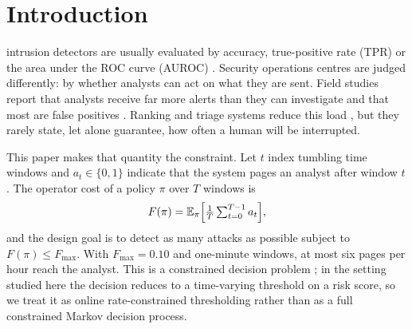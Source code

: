 \documentclass[journal,10pt,twocolumn]{IEEEtran}
\newcommand{\Fmax}{F_{\max}}
\newcommand{\EE}{\mathbb{E}}
\begin{document}
\section{Introduction}
 intrusion detectors are usually evaluated by accuracy, true-positive rate (TPR) or the area under the ROC curve (AUROC) \cite{chandola2009anomaly,buczak2016survey,sharafaldin2018cicids}. Security operations centres are judged differently: by whether analysts can act on what they are sent. Field studies report that analysts receive far more alerts than they can investigate and that most are false positives \cite{alahmadi2022falsepos,kokulu2019soc}. Ranking and triage systems reduce this load \cite{hassan2019nodoze}, but they rarely state, let alone guarantee, how often a human will be interrupted.

This paper makes that quantity the constraint. Let $t$ index tumbling time windows and $a_t\in\{0,1\}$ indicate that the system pages an analyst after window $t$. The operator cost of a policy $\pi$ over $T$ windows is
\begin{equation}
F(\pi)=\EE_{\pi}\Bigl[\tfrac{1}{T}\textstyle\sum_{t=0}^{T-1}a_t\Bigr],
\label{eq:F}
\end{equation}
and the design goal is to detect as many attacks as possible subject to $F(\pi)\le\Fmax$. With $\Fmax=0.10$ and one-minute windows, at most six pages per hour reach the analyst. This is a constrained decision problem \cite{altman1999cmdp}; in the setting studied here the decision reduces to a time-varying threshold on a risk score, so we treat it as online rate-constrained thresholding \cite{cotter2019constraints,mahdavi2012longterm} rather than as a full constrained Markov decision process.
\end{document}
